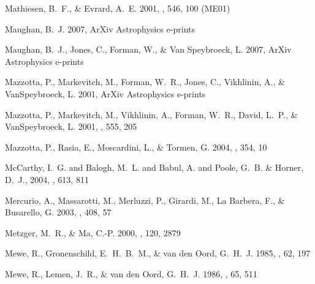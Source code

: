 \documentclass[12pt,preprint]{aastex}
\begin{document}
\begin{thebibliography}{}
{Mathiesen}, B.~F., \& {Evrard}, A.~E. 2001, \apj, 546, 100 (ME01)

{Maughan}, B.~J. 2007, ArXiv Astrophysics e-prints

{Maughan}, B.~J., {Jones}, C., {Forman}, W., \& {Van Speybroeck}, L. 2007,
  ArXiv Astrophysics e-prints

{Mazzotta}, P., {Markevitch}, M., {Forman}, W.~R., {Jones}, C., {Vikhlinin},
  A., \& {VanSpeybroeck}, L. 2001{}, ArXiv Astrophysics e-prints

{Mazzotta}, P., {Markevitch}, M., {Vikhlinin}, A., {Forman}, W.~R., {David},
  L.~P., \& {VanSpeybroeck}, L. 2001{}, \apj, 555, 205

{Mazzotta}, P., {Rasia}, E., {Moscardini}, L., \& {Tormen}, G. 2004, \mnras,
  354, 10

{{McCarthy}, I.~G. and {Balogh}, M.~L. and {Babul}, A. and {Poole},
  G.~B. \& {Horner}, D.~J.}, 2004, \apj, 613, 811

{Mercurio}, A., {Massarotti}, M., {Merluzzi}, P., {Girardi}, M., {La Barbera},
  F., \& {Busarello}, G. 2003, \aap, 408, 57

{Metzger}, M.~R., \& {Ma}, C.-P. 2000, \aj, 120, 2879

{Mewe}, R., {Gronenschild}, E.~H.~B.~M., \& {van den Oord}, G.~H.~J. 1985,
  \aaps, 62, 197

{Mewe}, R., {Lemen}, J.~R., \& {van den Oord}, G.~H.~J. 1986, \aaps, 65, 511


\end{thebibliography}
\end{document}
